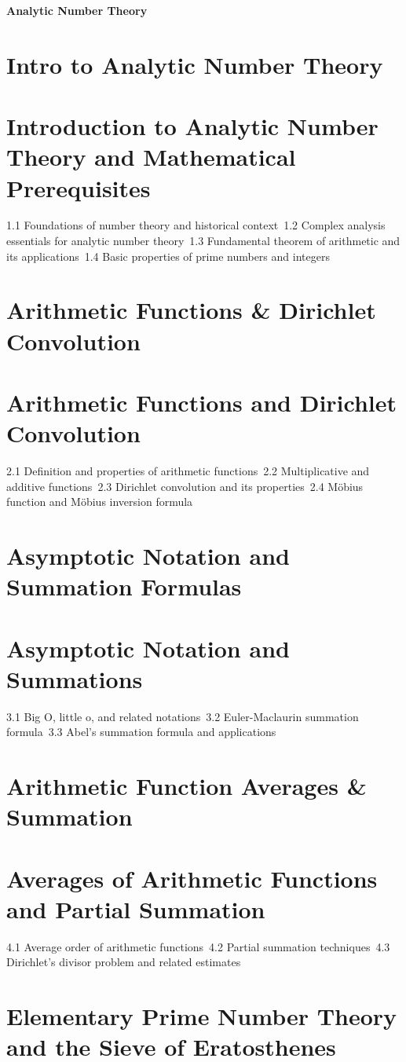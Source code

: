 {\LARGE \bf{Analytic Number Theory}}
\section{Intro to Analytic Number Theory}
\section{Introduction to Analytic Number Theory and Mathematical Prerequisites}
1.1 Foundations of number theory and historical context\
1.2 Complex analysis essentials for analytic number theory\
1.3 Fundamental theorem of arithmetic and its applications\
1.4 Basic properties of prime numbers and integers\
\section{Arithmetic Functions \& Dirichlet Convolution}
\section{Arithmetic Functions and Dirichlet Convolution}
2.1 Definition and properties of arithmetic functions\
2.2 Multiplicative and additive functions\
2.3 Dirichlet convolution and its properties\
2.4 Möbius function and Möbius inversion formula\
\section{Asymptotic Notation and Summation Formulas}
\section{Asymptotic Notation and Summations}
3.1 Big O, little o, and related notations\
3.2 Euler-Maclaurin summation formula\
3.3 Abel's summation formula and applications\
\section{Arithmetic Function Averages \& Summation}
\section{Averages of Arithmetic Functions and Partial Summation}
4.1 Average order of arithmetic functions\
4.2 Partial summation techniques\
4.3 Dirichlet's divisor problem and related estimates\
\section{Elementary Prime Number Theory and the Sieve of Eratosthenes}
